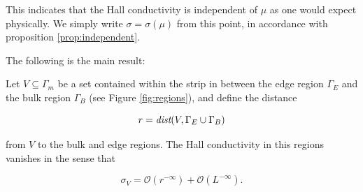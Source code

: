 \documentclass[12pt, letterpaper]{article}
\begin{document}
This indicates that the Hall conductivity is independent of $\mu$ as one would expect physically. We simply write $\sigma=\sigma(\mu)$ from this point, in accordance with proposition \ref{prop:independent}. 

The following is the main result:

\begin{theorem}
Let $V \subseteq \Gamma_m$ be a set contained within the strip in between the edge region $\Gamma_E$ and the bulk region $\Gamma_B$ (see Figure \ref{fig:regions}), and define the distance

\[r = \emph{dist}(V, \Gamma_E \cup \Gamma_B)\]

from $V$ to the bulk and edge regions. The Hall conductivity in this regions vanishes in the sense that

\[\sigma_V = \mathcal{O}(r^{-\infty}) + \mathcal{O}(L^{-\infty}).\]

\end{theorem}
\end{document}
